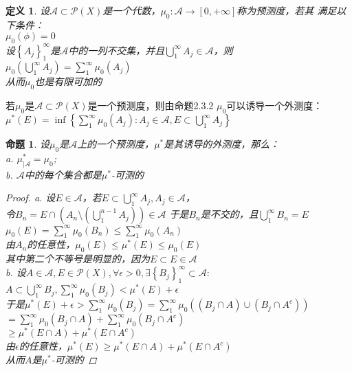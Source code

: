 \documentclass[12pt, a4paper, oneside]{ctexbook}
\newtheorem{definition}[theorem]{定义}
\newtheorem{proposition}[theorem]{命题}
\begin{document}
\begin{definition}
    设$\mathcal{A}\subset\mathcal{P}(X)$是一个代数，$\mu_0:\mathcal{A}\rightarrow[0,+\infty]$称为预测度，若其
    满足以下条件：\\
    $\mu_0(\phi)=0$\\
    设$\left\{A_j\right\}_1^{\infty}$是$\mathcal{A}$中的一列不交集，并且$\bigcup_1^{\infty}A_j\in\mathcal{A}$，则$\mu_0(\bigcup_1^{\infty}A_j)=\sum_1^{\infty}\mu_0(A_j)$\\
    从而$\mu_0$也是有限可加的
\end{definition}
若$\mu_0$是$\mathcal{A}\subset\mathcal{P}(X)$是一个预测度，则由命题2.3.2 $\mu_0$可以诱导一个外测度：
$\mu^*(E)=\inf\left\{\sum_1^{\infty}\mu_0(A_j):A_j\in\mathcal{A},E\subset\bigcup_1^{\infty}A_j\right\}$
\begin{proposition}
    设$\mu_0$是$\mathcal{A}$上的一个预测度，$\mu^*$是其诱导的外测度，那么：\\
    a. $\mu^*_{|\mathcal{A}}=\mu_0$;\\
    b. $\mathcal{A}$中的每个集合都是$\mu^*$-可测的
    \begin{proof}
        a. 设$E\in\mathcal{A}$，若$E\subset \bigcup_1^{\infty}A_j,A_j\in\mathcal{A}$，\\
        令$B_n=E\cap(A_n\setminus(\bigcup_1^{n-1}A_j))\in\mathcal{A}$
        于是$B_n$是不交的，且$\bigcup_1^{\infty}B_n=E$\\
        $\mu_0(E)=\sum_1^{\infty}\mu_0(B_n)\leq\sum_1^{\infty}\mu_0(A_n)$\\
        由$A_n$的任意性，$\mu_0(E)\leq\mu^*(E)\leq\mu_0(E)$\\
        其中第二个不等号是明显的，因为$E\subset E\in\mathcal{A}$\\
        b. 设$A\in\mathcal{A},E\in\mathcal{P}(X),\forall \epsilon>0,\exists\left\{B_j\right\}_1^{\infty}\subset\mathcal{A}:$\\
        $A\subset\bigcup_1^{\infty}B_j,\sum_1^{\infty}\mu_0(B_j)<\mu^*(E)+\epsilon$\\
        于是$\mu^*(E)+\epsilon>\sum_1^{\infty}\mu_0(B_j)=\sum_1^{\infty}\mu_0((B_j\cap A)\cup(B_j\cap A^c))$\\
        $=\sum_1^{\infty}\mu_0(B_j\cap A)+\sum_1^{\infty}\mu_0(B_j\cap A^c)$\\
        $\geq\mu^*(E\cap A)+\mu^*(E\cap A^c)$\\
        由$\epsilon$的任意性，$\mu^*(E)\geq\mu^*(E\cap A)+\mu^*(E\cap A^c)$\\
        从而$A$是$\mu^*$-可测的
    \end{proof}
\end{proposition}
\end{document}

